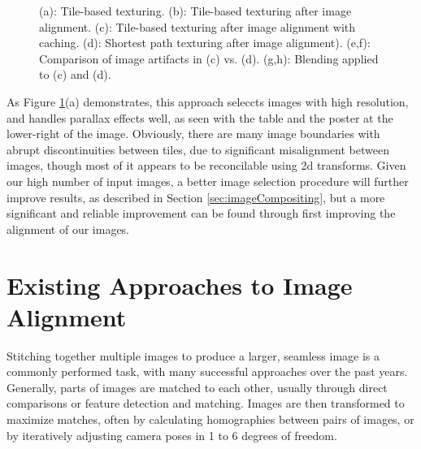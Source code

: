 \documentclass[]{spie}  %
\begin{document}
\begin{figure}
  \centering {}

  \caption{(a): Tile-based texturing. (b): Tile-based texturing after
    image alignment. (c): Tile-based texturing after image alignment
    with caching. (d): Shortest path texturing after image
    alignment). (e,f): Comparison of image artifacts in (c)
    vs. (d). (g,h): Blending applied to (c) and (d).}
  \label{fig:compareAll}
\end{figure}


As Figure \ref{fig:compareAll}(a) demonstrates, this approach seleccts
images with high resolution, and handles parallax effects well, as
seen with the table and the poster at the lower-right of the
image. Obviously, there are many image boundaries with abrupt
discontinuities between tiles, due to significant misalignment between
images, though most of it appears to be reconcilable using 2d
transforms. Given our high number of input images, a better image
selection procedure will further improve results, as described in
Section \ref{sec:imageCompositing}, but a more significant and
reliable improvement can be found through first improving the
alignment of our images.


\section{Existing Approaches to Image Alignment}
Stitching together multiple images to produce a larger, seamless image
is a commonly performed task, with many successful approaches over the
past years. Generally, parts of images are matched to each other,
usually through direct comparisons or feature detection and
matching. Images are then transformed to maximize matches, often by
calculating homographies between pairs of images, or by iteratively
adjusting camera poses in 1 to 6 degrees of freedom.
\end{document}
